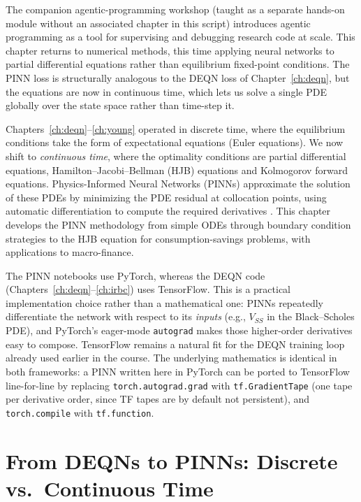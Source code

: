 \documentclass[11pt,a4paper]{report}
\begin{document}
The companion agentic-programming workshop (taught as a separate hands-on module without an associated chapter in this script) introduces agentic programming as a tool for supervising and debugging research code at scale.  This chapter returns to numerical methods, this time applying neural networks to partial differential equations rather than equilibrium fixed-point conditions.  The PINN loss is structurally analogous to the DEQN loss of Chapter~\ref{ch:deqn}, but the equations are now in continuous time, which lets us solve a single PDE globally over the state space rather than time-step it.

Chapters~\ref{ch:deqn}--\ref{ch:young} operated in discrete time, where the equilibrium conditions take the form of expectational equations (Euler equations).  We now shift to \emph{continuous time}, where the optimality conditions are partial differential equations, Hamilton--Jacobi--Bellman (HJB) equations and Kolmogorov forward equations.  Physics-Informed Neural Networks (PINNs) approximate the solution of these PDEs by minimizing the PDE residual at collocation points, using automatic differentiation to compute the required derivatives \citep{sirignano2018dgm, raissi2019physics}.  This chapter develops the PINN methodology from simple ODEs through boundary condition strategies to the HJB equation for consumption-savings problems, with applications to macro-finance.

\begin{remarkbox}
The PINN notebooks use PyTorch, whereas the DEQN code (Chapters~\ref{ch:deqn}--\ref{ch:irbc}) uses TensorFlow.  This is a practical implementation choice rather than a mathematical one: PINNs repeatedly differentiate the network with respect to its \emph{inputs} (e.g., $V_{SS}$ in the Black--Scholes PDE), and PyTorch's eager-mode \texttt{autograd} makes those higher-order derivatives easy to compose.  TensorFlow remains a natural fit for the DEQN training loop already used earlier in the course.  The underlying mathematics is identical in both frameworks: a PINN written here in PyTorch can be ported to TensorFlow line-for-line by replacing \texttt{torch.autograd.grad} with \texttt{tf.GradientTape} (one tape per derivative order, since TF tapes are by default not persistent), and \texttt{torch.compile} with \texttt{tf.function}.
\end{remarkbox}

\section{From DEQNs to PINNs: Discrete vs.\ Continuous Time}
\end{document}
